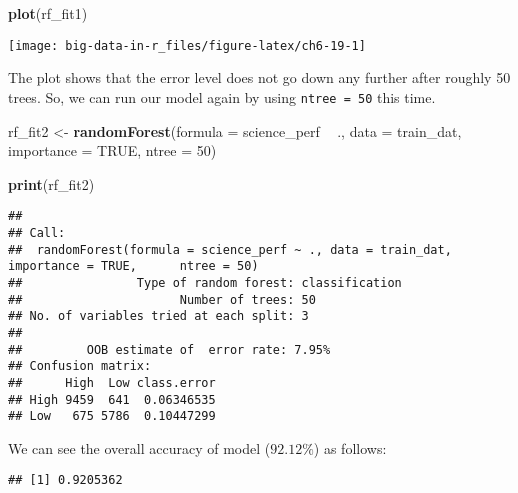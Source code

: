 \documentclass[]{book}
\newenvironment{Shaded}{\begin{snugshade}}{\end{snugshade}}
\newcommand{\DataTypeTok}[1]{\textcolor[rgb]{0.13,0.29,0.53}{#1}}
\newcommand{\DecValTok}[1]{\textcolor[rgb]{0.00,0.00,0.81}{#1}}
\newcommand{\KeywordTok}[1]{\textcolor[rgb]{0.13,0.29,0.53}{\textbf{#1}}}
\newcommand{\NormalTok}[1]{#1}
\newcommand{\OperatorTok}[1]{\textcolor[rgb]{0.81,0.36,0.00}{\textbf{#1}}}
\newcommand{\OtherTok}[1]{\textcolor[rgb]{0.56,0.35,0.01}{#1}}
\newcommand{\StringTok}[1]{\textcolor[rgb]{0.31,0.60,0.02}{#1}}
\begin{document}
\begin{Shaded}
\begin{Highlighting}[]
\KeywordTok{plot}\NormalTok{(rf_fit1)}
\end{Highlighting}
\end{Shaded}

\texttt{[image: big-data-in-r\_files/figure-latex/ch6-19-1]}

The plot shows that the error level does not go down any further after roughly 50 trees. So, we can run our model again by using \texttt{ntree\ =\ 50} this time.

\begin{Shaded}
\begin{Highlighting}[]
\NormalTok{rf_fit2 <-}\StringTok{ }\KeywordTok{randomForest}\NormalTok{(}\DataTypeTok{formula =}\NormalTok{ science_perf }\OperatorTok{~}\StringTok{ }\NormalTok{.,}
                        \DataTypeTok{data =}\NormalTok{ train_dat,}
                        \DataTypeTok{importance =} \OtherTok{TRUE}\NormalTok{, }\DataTypeTok{ntree =} \DecValTok{50}\NormalTok{)}

\KeywordTok{print}\NormalTok{(rf_fit2)}
\end{Highlighting}
\end{Shaded}

\begin{verbatim}
## 
## Call:
##  randomForest(formula = science_perf ~ ., data = train_dat, importance = TRUE,      ntree = 50) 
##                Type of random forest: classification
##                      Number of trees: 50
## No. of variables tried at each split: 3
## 
##         OOB estimate of  error rate: 7.95%
## Confusion matrix:
##      High  Low class.error
## High 9459  641  0.06346535
## Low   675 5786  0.10447299
\end{verbatim}

We can see the overall accuracy of model (\(92.12\%\)) as follows:

\begin{Shaded}
\end{Shaded}

\begin{verbatim}
## [1] 0.9205362
\end{verbatim}
\end{document}
